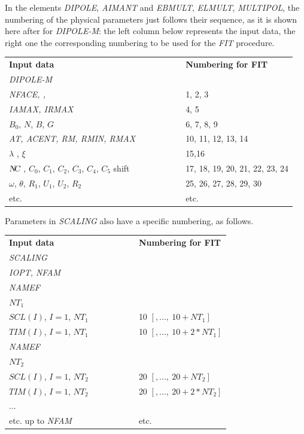 \noindent In the elements  \textsl{DIPOLE}, \textsl{AIMANT} 
and \textsl{EBMULT}, \textsl{ELMULT}, \textsl{MULTIPOL}, the
numbering of the physical parameters just follows their sequence, as it is shown here after 
for \textsl{DIPOLE-M}: the left column below represents the input data, the 
right one the corresponding numbering to be used for the \textsl{FIT} procedure. 
\begin{center}
{\renewcommand{\arraystretch}{1}
	\begin{tabular}{lcl}
	\textbf{Input  data}  &~~~~~~~~&  \textbf{Numbering  for  FIT}\\
      \textsl{DIPOLE-M}                      \\
	\textsl{NFACE,  \IC,  \IL}     &  &  1, 2, 3 \\
	\textsl{IAMAX,  IRMAX}         &&  4, 5    \\
	$B_0$, $N$, $B$, $G$  &&  6, 7, 8, 9\\
	\textsl{AT, ACENT, RM, RMIN, RMAX} &&  10, 11, 12, 13, 14 \\
	$\lambda$ , $\xi$     &&  15,16    \\
	$\textsl{N\!C }$, $C_0$, $C_1$, $C_2$, $C_3$, $C_4$, $C_5$ shift
	                      &&  17, 18, 19, 20, 21, 22, 23, 24\\
	$\omega$, $\theta$, $R_1$, $U_1$, $U_2$, $R_2$ 
	                      && 25, 26, 27, 28, 29, 30 \\
	etc.                 && etc.
	\end{tabular}   }
\end{center}

\newpage %

\noindent Parameters in \textsl{SCALING} also have a specific numbering, as follows. 
\begin{center}
{\renewcommand{\arraystretch}{1}
	\begin{tabular}{lcl}
	\textbf{Input  data}  &~~~~~~~~&  \textbf{Numbering  for  FIT}\\
      \textsl{SCALING}                      \\
	\textsl{IOPT, NFAM }      & &  \\
	\textsl{NAMEF}         &&    \\
	$NT_1$    &      &            \\
	$SCL(I)$, $I=1$, $NT_1$ &&  10 $[,...,~10+NT_1]$ \\
	$TIM(I)$, $I=1$, $NT_1$ &&  10 $[,...,~10+2*NT_1]$ \\
	\textsl{NAMEF}        & &    \\
	$NT_2$    &               &   \\
	$SCL(I)$, $I=1$, $NT_2$ &&  20 $[,...,~20+NT_2]$ \\
	$TIM(I)$, $I=1$, $NT_2$ &&  20 $[,...,~20+2*NT_2]$ \\
          {\Large...}   \\
	etc.  up to \textsl{NFAM}       &        & etc.
	\end{tabular}   }
\end{center}

